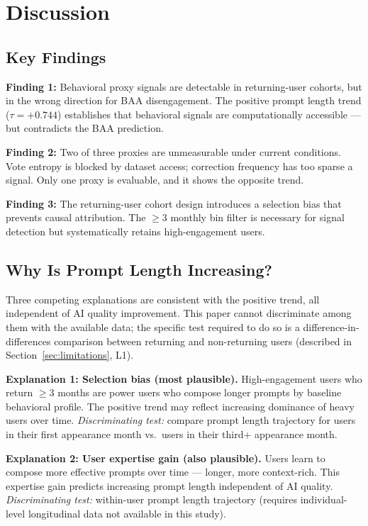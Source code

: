 \section{Discussion}
\label{sec:discussion}

\subsection{Key Findings}

\textbf{Finding 1:} Behavioral proxy signals are detectable in returning-user cohorts, but in the wrong direction for BAA disengagement. The positive prompt length trend ($\tau = +0.744$) establishes that behavioral signals are computationally accessible --- but contradicts the BAA prediction.

\textbf{Finding 2:} Two of three proxies are unmeasurable under current conditions. Vote entropy is blocked by dataset access; correction frequency has too sparse a signal. Only one proxy is evaluable, and it shows the opposite trend.

\textbf{Finding 3:} The returning-user cohort design introduces a selection bias that prevents causal attribution. The $\geq$3 monthly bin filter is necessary for signal detection but systematically retains high-engagement users.

\subsection{Why Is Prompt Length Increasing?}

Three competing explanations are consistent with the positive trend, all independent of AI quality improvement. This paper cannot discriminate among them with the available data; the specific test required to do so is a difference-in-differences comparison between returning and non-returning users (described in Section~\ref{sec:limitations}, L1).

\textbf{Explanation 1: Selection bias (most plausible).} High-engagement users who return $\geq$3 months are power users who compose longer prompts by baseline behavioral profile. The positive trend may reflect increasing dominance of heavy users over time. \emph{Discriminating test:} compare prompt length trajectory for users in their first appearance month vs.\ users in their third+ appearance month.

\textbf{Explanation 2: User expertise gain (also plausible).} Users learn to compose more effective prompts over time --- longer, more context-rich. This expertise gain predicts increasing prompt length independent of AI quality. \emph{Discriminating test:} within-user prompt length trajectory (requires individual-level longitudinal data not available in this study).


